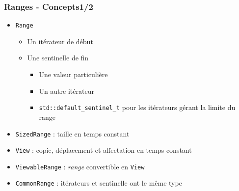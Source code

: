 \documentclass[C++.tex]{subfiles}
\begin{document}
\begin{frame}[fragile]
	\frametitle{Ranges - Concepts\titlehfill{}1/2}
	\begin{itemize}
		\item \lstinline|Range|
		\begin{itemize}
			\item Un itérateur de début
			\item Une sentinelle de fin
			\begin{itemize}
				\item Une valeur particulière
				\item Un autre itérateur


				\item \lstinline|std::default_sentinel_t| pour les itérateurs gérant la limite du range

			\end{itemize}
		\end{itemize}

		\item \lstinline|SizedRange| : taille en temps constant
		\item \lstinline|View| : copie, déplacement et affectation en temps constant
		\item \lstinline|ViewableRange| : \textit{range} convertible en \lstinline|View|
		\item \lstinline|CommonRange| : itérateurs et sentinelle ont le même type
	\end{itemize}
\end{frame}
\end{document}

